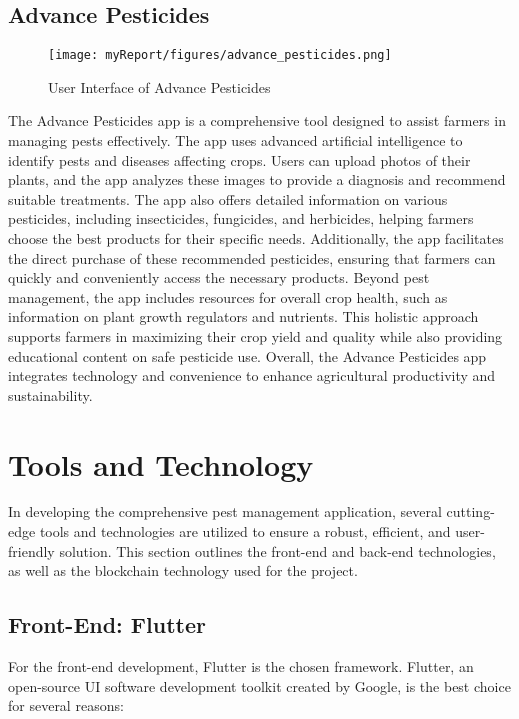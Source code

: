 \subsection{Advance Pesticides}
\begin{figure}[ht]
\texttt{[image: myReport/figures/advance\_pesticides.png]}
\caption{User Interface of Advance Pesticides}
\end{figure}
The Advance Pesticides app is a comprehensive tool designed to assist farmers in managing pests effectively. The app uses advanced artificial intelligence to identify pests and diseases affecting crops. Users can upload photos of their plants, and the app analyzes these images to provide a diagnosis and recommend suitable treatments. The app also offers detailed information on various pesticides, including insecticides, fungicides, and herbicides, helping farmers choose the best products for their specific needs. Additionally, the app facilitates the direct purchase of these recommended pesticides, ensuring that farmers can quickly and conveniently access the necessary products. Beyond pest management, the app includes resources for overall crop health, such as information on plant growth regulators and nutrients. This holistic approach supports farmers in maximizing their crop yield and quality while also providing educational content on safe pesticide use. Overall, the Advance Pesticides app integrates technology and convenience to enhance agricultural productivity and sustainability.



\section{Tools and Technology}

In developing the comprehensive pest management application, several cutting-edge tools and technologies are utilized to ensure a robust, efficient, and user-friendly solution. This section outlines the front-end and back-end technologies, as well as the blockchain technology used for the project.

\subsection{Front-End: Flutter}

For the front-end development, Flutter is the chosen framework. Flutter, an open-source UI software development toolkit created by Google, is the best choice for several reasons:

